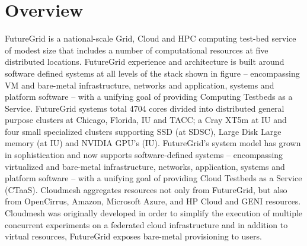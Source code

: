 
\section{Overview}

FutureGrid is a national-scale Grid, Cloud and HPC computing test-bed service of modest size that includes a number of computational resources at five distributed locations. FutureGrid experience and architecture is built around software defined systems at all levels of the stack shown in figure – encompassing VM and bare-metal infrastructure, networks and application, systems and platform software – with a unifying goal of providing Computing Testbeds as a Service. FutureGrid systems total 4704 cores divided into distributed general purpose clusters at Chicago, Florida, IU and TACC; a Cray XT5m at IU and four small specialized clusters supporting SSD (at SDSC), Large Disk Large memory (at IU) and NVIDIA GPU’s (IU). FutureGrid’s system model has grown in sophistication and now supports software-defined systems – encompassing virtualized and bare-metal infrastructure, networks, application, systems and platform software – with a unifying goal of providing Cloud Testbeds as a Service (CTaaS). Cloudmesh aggregates resources not only from FutureGrid, but also from OpenCirrus, Amazon, Microsoft Azure, and HP Cloud and GENI resources. Cloudmesh was originally developed in order to simplify the execution of multiple concurrent experiments on a federated cloud infrastructure and in addition to virtual resources, FutureGrid exposes bare-metal provisioning to users.

